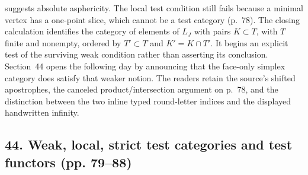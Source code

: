 \documentclass[10pt,oneside]{book}
\begin{document}
suggests absolute asphericity. The local test condition still fails because a minimal vertex has a one-point slice, which cannot be a test category (p.~78). The closing calculation identifies the category of elements of $L_J$ with pairs $K\subset T$, with $T$ finite and nonempty, ordered by $T'\subset T$ and $K'=K\cap T'$. It begins an explicit test of the surviving weak condition rather than asserting its conclusion. Section~44 opens the following day by announcing that the face-only simplex category does satisfy that weaker notion. The readers retain the source's shifted apostrophes, the canceled product/intersection argument on p.~78, and the distinction between the two inline typed round-letter indices and the displayed handwritten infinity.

\subsection*{44. Weak, local, strict test categories and test functors (pp. 79--88)}
\end{document}
